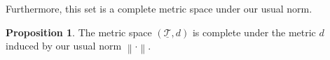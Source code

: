 \documentclass[10pt,a4paper]{paper}
\theoremstyle{definition}
\newtheorem{proposition}[theorem]{Proposition}
\newtheorem{lemma}[theorem]{Lemma}
\newcommand{\reals}{\mathbb{R}}
\newcommand{\realsnonneg}{\reals_{\geq 0}}
\newcommand{\states}{\mathcal{X}}
\newcommand{\lt}{\underline{T}}
\newcommand{\gambles}{\mathcal{L}}
\newcommand{\gamblesX}{\gambles(\states)}
\newcommand{\lrate}{\underline{Q}}
\newcommand{\norm}[1]{\left\lVert #1 \right\rVert}
\newcommand{\coloneqq}{:\!=}
\begin{document}
\noindent Furthermore, this set is a complete metric space under our usual norm.

\begin{proposition}\label{lemma:completemetricspace}
The metric space $(\underline{\mathcal{T}},d)$ is complete under the metric $d$ induced by our usual norm $\norm{\cdot}$.
\end{proposition}


%

\end{document}
